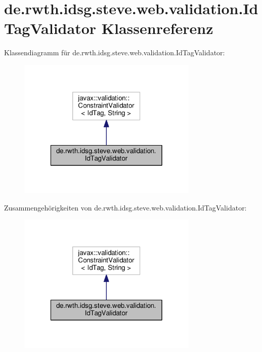 \hypertarget{classde_1_1rwth_1_1idsg_1_1steve_1_1web_1_1validation_1_1_id_tag_validator}{\section{de.\-rwth.\-idsg.\-steve.\-web.\-validation.\-Id\-Tag\-Validator Klassenreferenz}
\label{classde_1_1rwth_1_1idsg_1_1steve_1_1web_1_1validation_1_1_id_tag_validator}
}


Klassendiagramm für de.\-rwth.\-idsg.\-steve.\-web.\-validation.\-Id\-Tag\-Validator\-:\nopagebreak
\begin{figure}[H]
\begin{center}
\leavevmode
\includegraphics[width=244pt]{classde_1_1rwth_1_1idsg_1_1steve_1_1web_1_1validation_1_1_id_tag_validator__inherit__graph}
\end{center}
\end{figure}


Zusammengehörigkeiten von de.\-rwth.\-idsg.\-steve.\-web.\-validation.\-Id\-Tag\-Validator\-:\nopagebreak
\begin{figure}[H]
\begin{center}
\leavevmode
\includegraphics[width=244pt]{classde_1_1rwth_1_1idsg_1_1steve_1_1web_1_1validation_1_1_id_tag_validator__coll__graph}
\end{center}
\end{figure}
